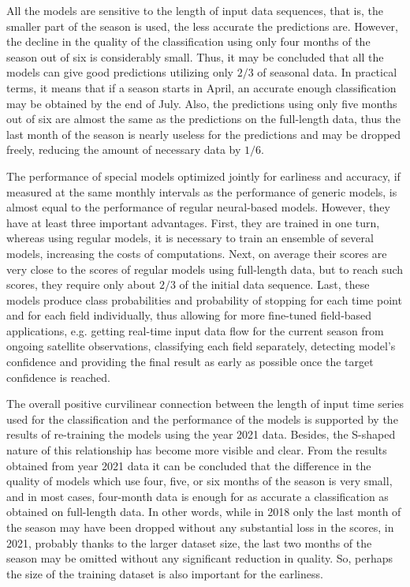 \documentclass{article}
\begin{document}
All the models are sensitive to the length of input data sequences, that is, the smaller part of the season is used, the less accurate the predictions are. However, the decline in the quality of the classification using only four months of the season out of six is considerably small. Thus, it may be concluded that all the models can give good predictions utilizing only $2/3$ of seasonal data. In practical terms, it means that if a season starts in April, an accurate enough classification may be obtained by the end of July. Also, the predictions using only five months out of six are almost the same as the predictions on the full-length data, thus the last month of the season is nearly useless for the predictions and may be dropped freely, reducing the amount of necessary data by $1/6$.

The performance of special models optimized jointly for earliness and accuracy, if measured at the same monthly intervals as the performance of generic models, is almost equal to the performance of regular neural-based models. However, they have at least three important advantages. First, they are trained in one turn, whereas using regular models, it is necessary to train an ensemble of several models, increasing the costs of computations. Next, on average their scores are very close to the scores of regular models using full-length data, but to reach such scores, they require only about $2/3$ of the initial data sequence. Last, these models produce class probabilities and probability of stopping for each time point and for each field individually, thus allowing for more fine-tuned field-based applications, e.g. getting real-time input data flow for the current season from ongoing satellite observations, classifying each field separately, detecting model's confidence and providing the final result as early as possible once the target confidence is reached.

The overall positive curvilinear connection between the length of input time series used for the classification and the performance of the models is supported by the results of re-training the models using the year 2021 data. Besides, the S-shaped nature of this relationship has become more visible and clear. From the results obtained from year 2021 data it can be concluded that the difference in the quality of models which use four, five, or six months of the season is very small, and in most cases, four-month data is enough for as accurate a classification as obtained on full-length data. In other words, while in 2018 only the last month of the season may have been dropped without any substantial loss in the scores, in 2021, probably thanks to the larger dataset size, the last two months of the season may be omitted without any significant reduction in quality. So, perhaps the size of the training dataset is also important for the earliness. 
\end{document}
